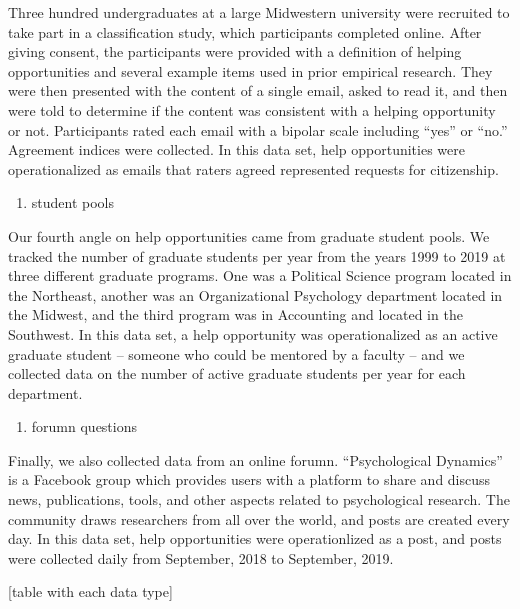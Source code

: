 \documentclass[english,,man]{apa6}
\providecommand{\tightlist}{%
  \setlength{\itemsep}{0pt}\setlength{\parskip}{0pt}}
\theoremstyle{definition}
\theoremstyle{definition}
\theoremstyle{definition}
\theoremstyle{remark}
\begin{document}
Three hundred undergraduates at a large Midwestern university were
recruited to take part in a classification study, which participants
completed online. After giving consent, the participants were provided
with a definition of helping opportunities and several example items
used in prior empirical research. They were then presented with the
content of a single email, asked to read it, and then were told to
determine if the content was consistent with a helping opportunity or
not. Participants rated each email with a bipolar scale including
\enquote{yes} or \enquote{no.} Agreement indices were collected. In this
data set, help opportunities were operationalized as emails that raters
agreed represented requests for citizenship.

\begin{enumerate}
\def\labelenumi{(\arabic{enumi})}
\setcounter{enumi}{3}
\tightlist
\item
  student pools
\end{enumerate}

Our fourth angle on help opportunities came from graduate student pools.
We tracked the number of graduate students per year from the years 1999
to 2019 at three different graduate programs. One was a Political
Science program located in the Northeast, another was an Organizational
Psychology department located in the Midwest, and the third program was
in Accounting and located in the Southwest. In this data set, a help
opportunity was operationalized as an active graduate student -- someone
who could be mentored by a faculty -- and we collected data on the
number of active graduate students per year for each department.

\begin{enumerate}
\def\labelenumi{(\arabic{enumi})}
\setcounter{enumi}{4}
\tightlist
\item
  forumn questions
\end{enumerate}

Finally, we also collected data from an online forumn.
\enquote{Psychological Dynamics} is a Facebook group which provides
users with a platform to share and discuss news, publications, tools,
and other aspects related to psychological research. The community draws
researchers from all over the world, and posts are created every day. In
this data set, help opportunities were operationlized as a post, and
posts were collected daily from September, 2018 to September, 2019.

{[}table with each data type{]}
\end{document}
